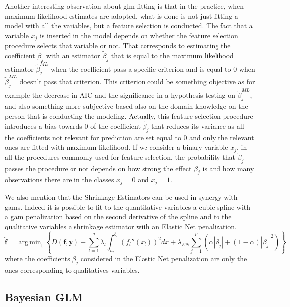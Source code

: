 \documentclass[a4paper, twoside, openright, 12pt]{report}
\DeclareMathOperator*{\argmin}{arg\,min}  %
\theoremstyle{definition}
\theoremstyle{definition}
\theoremstyle{definition}
\theoremstyle{remark}
\begin{document}
Another interesting observation about \ac{glm} fitting is that in the practice, when maximum likelihood estimates are adopted, what is done is not just fitting a model with all the variables, but a feature selection is conducted. The fact that a variable \(x_j\) is inserted in the model depends on whether the feature selection procedure selects that variable or not. That corresponds to estimating the coefficient \(\beta_j\) with an estimator \(\tilde{\beta}_j\) that is equal to the maximum likelihood estimator \(\tilde{\beta}_j^{ML}\) when the coefficient pass a specific criterion and is equal to \(0\) when \(\tilde{\beta}_j^{ML}\) doesn't pass that criterion. This criterion could be something objective as for example the decrease in AIC and the significance in a hypothesis testing on \(\tilde{\beta}_j^{ML}\), and also something more subjective based also on the domain knowledge on the person that is conducting the modeling. Actually, this feature selection procedure introduces a bias towards \(0\) of the coefficient \(\tilde{\beta}_j\) that reduces its variance as all the coefficients not relevant for prediction are set equal to \(0\) and only the relevant ones are fitted with maximum likelihood. If we consider a binary variable \(x_j\), in all the procedures commonly used for feature selection, the probability that \(\tilde{\beta}_j\) passes the procedure or not depends on how strong the effect \(\beta_j\) is and how many observations there are in the classes \(x_j=0\) and \(x_j=1\).

We also mention that the Shrinkage Estimators can be used in synergy with \ac{gam}s. Indeed it is possible to fit to the quantitative variables a cubic spline with a \ac{gam} penalization based on the second derivative of the spline and to the qualitative variables a shrinkage estimator with an Elastic Net penalization.
\begin{equation}
\label{eq:gam-en-est-deviance-multi}
\boldsymbol{\hat{f}} = \argmin_{\boldsymbol{f}}
{\left\{
  D(\boldsymbol{f}, \boldsymbol{y})
    + \sum_{l=1}^{q}{
      \lambda_l \int_{a_l}^{b_l}{\left( f_l''(x_l) \right)^2 dx}
    }
    + \lambda_{EN} 
      \sum_{j=1}^p{\left(\alpha |\beta_j| + (1 - \alpha) |\beta_j|^2\right)}
\right\}
} 
\end{equation}
where the coefficients \(\beta_j\) considered in the Elastic Net penalization are only the ones corresponding to qualitatives variables.

\newpage

\hypertarget{chap:bayes-glm}{%
\subsection{Bayesian GLM}\label{chap:bayes-glm}}
\end{document}
